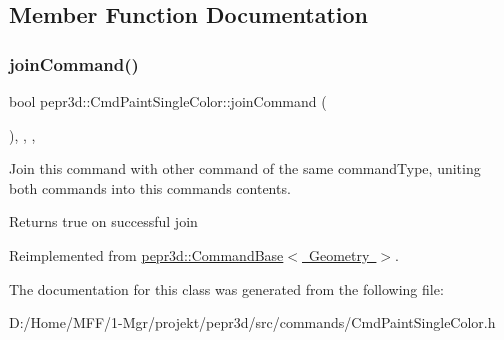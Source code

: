 \subsection{Member Function Documentation}
\mbox{\label{classpepr3d_1_1_cmd_paint_single_color_a99945a65b5efae3151ebdbae619f3eed}} 
\subsubsection{\texorpdfstring{joinCommand()}{joinCommand()}}
{\footnotesize\ttfamily bool pepr3d\+::\+Cmd\+Paint\+Single\+Color\+::join\+Command (\begin{DoxyParamCaption}\item[{const \mbox{\hyperlink{classpepr3d_1_1_command_base}{Command\+Base}} \&}]{ }\end{DoxyParamCaption})\hspace{0.3cm}{\ttfamily [inline]}, {\ttfamily [override]}, {\ttfamily [protected]}, {\ttfamily [virtual]}}



Join this command with other command of the same command\+Type, uniting both commands into this command\textquotesingle{}s contents. 

\begin{DoxyReturn}{Returns}
true on successful join 
\end{DoxyReturn}


Reimplemented from \mbox{\hyperlink{classpepr3d_1_1_command_base_a9ef408154b7cb446e626e049f268abb4}{pepr3d\+::\+Command\+Base$<$ Geometry $>$}}.



The documentation for this class was generated from the following file\+:\begin{DoxyCompactItemize}
\item 
D\+:/\+Home/\+M\+F\+F/1-\/\+Mgr/projekt/pepr3d/src/commands/Cmd\+Paint\+Single\+Color.\+h\end{DoxyCompactItemize}
